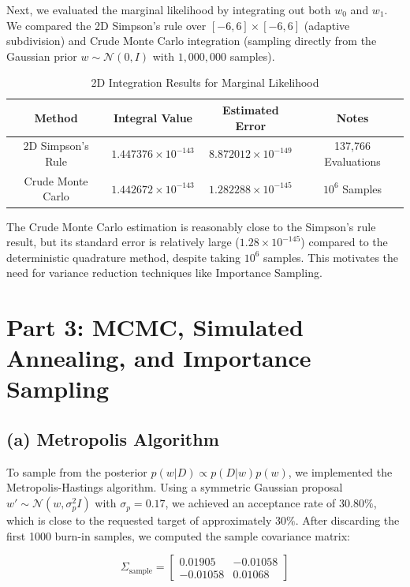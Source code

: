 \documentclass[11pt]{article}
\begin{document}
Next, we evaluated the marginal likelihood by integrating out both $w_0$ and $w_1$.
We compared the 2D Simpson's rule over $[-6, 6] \times [-6, 6]$ (adaptive subdivision) and Crude Monte Carlo integration (sampling directly from the Gaussian prior $w \sim \mathcal{N}(0, I)$ with $1,000,000$ samples).

\begin{table}[H]
    \centering
    \begin{tabular}{|c|c|c|c|}
    \hline
    \textbf{Method} & \textbf{Integral Value} & \textbf{Estimated Error} & \textbf{Notes} \\
    \hline
    2D Simpson's Rule & $1.447376 \times 10^{-143}$ & $8.872012 \times 10^{-149}$ & 137,766 Evaluations \\
    Crude Monte Carlo & $1.442672 \times 10^{-143}$ & $1.282288 \times 10^{-145}$ & $10^6$ Samples \\
    \hline
    \end{tabular}
    \caption{2D Integration Results for Marginal Likelihood}
\end{table}

The Crude Monte Carlo estimation is reasonably close to the Simpson's rule result, but its standard error is relatively large ($1.28 \times 10^{-145}$) compared to the deterministic quadrature method, despite taking $10^6$ samples. This motivates the need for variance reduction techniques like Importance Sampling.

\section{Part 3: MCMC, Simulated Annealing, and Importance Sampling}

\subsection{(a) Metropolis Algorithm}

To sample from the posterior $p(w|D) \propto p(D|w)p(w)$, we implemented the Metropolis-Hastings algorithm. Using a symmetric Gaussian proposal $w' \sim \mathcal{N}(w, \sigma_p^2 I)$ with $\sigma_p = 0.17$, we achieved an acceptance rate of $30.80\%$, which is close to the requested target of approximately $30\%$. After discarding the first 1000 burn-in samples, we computed the sample covariance matrix:

\begin{equation*}
\Sigma_{\text{sample}} = \begin{bmatrix}
0.01905 & -0.01058 \\
-0.01058 & 0.01068
\end{bmatrix}
\end{equation*}
\end{document}
